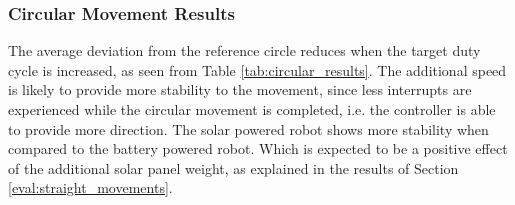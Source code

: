 \begin{table}[t]
	\centering
	\caption{The Euclidean distance between the measurements and a best fitting circle.}
	\label{tab:circular_results}
\end{table}

\subsubsection{Circular Movement Results}
The average deviation from the reference circle reduces when the target duty cycle is increased, as seen from Table \ref{tab:circular_results}.
The additional speed is likely to provide more stability to the movement, since less interrupts are experienced while the circular movement is completed, i.e. the controller is able to provide more direction.
The solar powered robot shows more stability when compared to the battery powered robot.
Which is expected to be a positive effect of the additional solar panel weight, as explained in the results of Section \ref{eval:straight_movements}.
